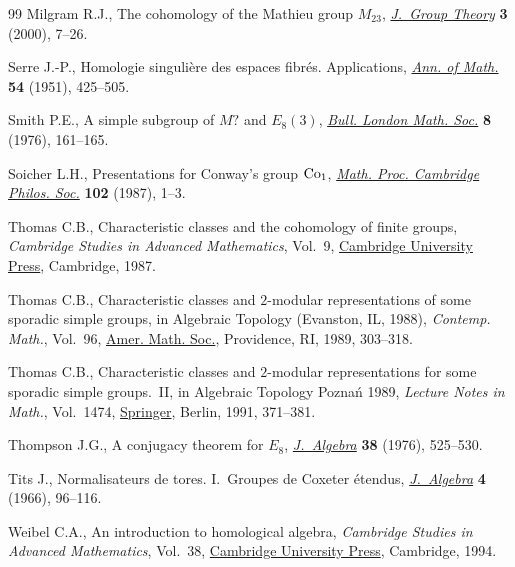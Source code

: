 \documentclass[pdftex]{sigma}
\numberwithin{equation}{section}
\newcommand\<\langle
\renewcommand\>\rangle
\begin{document}
\begin{thebibliography}{99}
Milgram R.J., The cohomology of the {M}athieu group {$M_{23}$},
 \href{https://doi.org/10.1515/jgth.2000.008}{\textit{J.~Group Theory}} \textbf{3} (2000), 7--26.

Serre J.-P., Homologie singuli\`ere des espaces fibr\'{e}s. {A}pplications,
 \href{https://doi.org/10.2307/1969485}{\textit{Ann. of Math.}} \textbf{54} (1951), 425--505.

Smith P.E., A simple subgroup of {$M?$} and {$E_{8}(3)$}, \href{https://doi.org/10.1112/blms/8.2.161}{\textit{Bull. London
 Math. Soc.}} \textbf{8} (1976), 161--165.

Soicher L.H., Presentations for {C}onway's group {${\rm Co}_1$}, \href{https://doi.org/10.1017/S0305004100066986}{\textit{Math.
 Proc. Cambridge Philos. Soc.}} \textbf{102} (1987), 1--3.

Thomas C.B., Characteristic classes and the cohomology of finite groups,
 \textit{Cambridge Studies in Advanced Mathematics}, Vol.~9, \href{https://doi.org/10.1017/CBO9780511897344}{Cambridge
 University Press}, Cambridge, 1987.

Thomas C.B., Characteristic classes and {$2$}-modular representations of some
 sporadic simple groups, in Algebraic Topology ({E}vanston, {IL}, 1988),
 \textit{Contemp. Math.}, Vol.~96, \href{https://doi.org/10.1090/conm/096/1022691}{Amer. Math. Soc.}, Providence, RI, 1989,
 303--318.

Thomas C.B., Characteristic classes and {$2$}-modular representations for some
 sporadic simple groups.~{II}, in Algebraic Topology {P}ozna\'{n} 1989,
 \textit{Lecture Notes in Math.}, Vol.~1474, \href{https://doi.org/10.1007/BFb0084758}{Springer}, Berlin, 1991, 371--381.

Thompson J.G., A conjugacy theorem for {$E_{8}$}, \href{https://doi.org/10.1016/0021-8693(76)90235-0}{\textit{J.~Algebra}}
 \textbf{38} (1976), 525--530.

Tits J., Normalisateurs de tores. {I}.~{G}roupes de {C}oxeter \'{e}tendus,
 \href{https://doi.org/10.1016/0021-8693(66)90053-6}{\textit{J.~Algebra}} \textbf{4} (1966), 96--116.

Weibel C.A., An introduction to homological algebra, \textit{Cambridge Studies
 in Advanced Mathematics}, Vol.~38, \href{https://doi.org/10.1017/CBO9781139644136}{Cambridge University Press}, Cambridge,
 1994.


\end{thebibliography}
\end{document}
